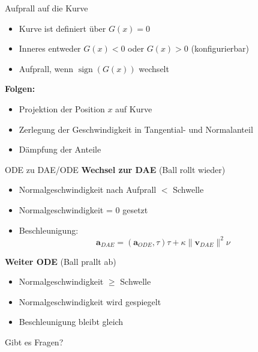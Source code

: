 \documentclass[aspectratio=169]{beamer}
\begin{document}
\begin{frame}{Aufprall auf die Kurve}	
	\begin{itemize}
		\item Kurve ist definiert über $G(x) = 0$
		\item Inneres entweder $G(x) < 0$ oder $G(x) > 0$ (konfigurierbar)
		\item Aufprall, wenn $\operatorname{sign}(G(x))$ wechselt
	\end{itemize}
	\pause
	
	\textbf{Folgen:}
	\begin{itemize}
		\item Projektion der Position $x$ auf Kurve
		\item Zerlegung der Geschwindigkeit in Tangential- und Normalanteil
		\item Dämpfung der Anteile
	\end{itemize}
\end{frame}

\begin{frame}{ODE zu DAE/ODE}
	\textbf{Wechsel zur DAE} (Ball rollt wieder)
	\begin{itemize}
		\item Normalgeschwindigkeit nach Aufprall $<$ Schwelle
		\pause
		\item Normalgeschwindigkeit = 0 gesetzt
		\item Beschleunigung:
		\[
		\mathbf{a}_{DAE} = (\mathbf{a}_{ODE}, \tau) \tau + \kappa \| \mathbf{v}_{DAE} \|^2 \nu
		\]
	\end{itemize}
	\pause
	\textbf{Weiter ODE} (Ball prallt ab)
	\begin{itemize}
		\item Normalgeschwindigkeit $\geq$ Schwelle
		\pause
		\item Normalgeschwindigkeit wird gespiegelt
		\item Beschleunigung bleibt gleich
	\end{itemize}
\end{frame} 

\begin{frame}[standout]
	Gibt es Fragen?
\end{frame}
\end{document}
